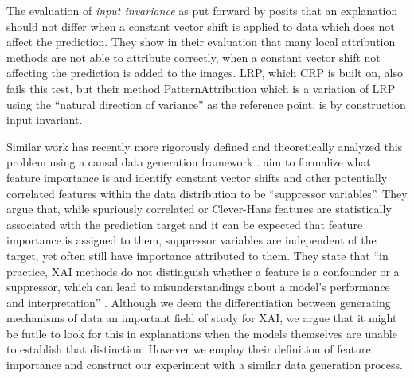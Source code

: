 The evaluation of \textit{input invariance} as put forward by \citet{Kindermans2019, Kindermans2017} posits that an explanation should not differ when a constant vector shift is applied to data which does not affect the prediction. They show in their evaluation that many local attribution methods are not able to attribute correctly, when a constant vector shift not affecting the prediction is added to the images. LRP, which CRP is built on, also fails this test, but their method PatternAttribution which is a variation of LRP using the ``natural direction of variance'' as the reference point, is by construction input invariant.

Similar work has recently more rigorously defined and theoretically analyzed this problem using a causal data generation framework \citep{Wilming2023,Wilming2022, Clark2023}. \cite{Wilming2022} aim to formalize what feature importance is and identify constant vector shifts and other potentially correlated features within the data distribution to be ``suppressor variables''.
They argue that, while spuriously correlated or Clever-Hans features are statistically associated with the prediction target and it can be expected that feature importance is assigned to them, suppressor variables are independent of the target, yet often still have importance attributed to them. They state that ``in practice, XAI methods do not distinguish whether a feature is a confounder or a suppressor, which can lead to misunderstandings about a model's performance and interpretation'' \citep{Wilming2023}. Although we deem the differentiation between generating mechanisms of data an important field of study for XAI, we argue that it might be futile to look for this in explanations when the models themselves are unable to establish that distinction. 
However we employ their definition of feature importance and construct our experiment with a similar data generation process.


